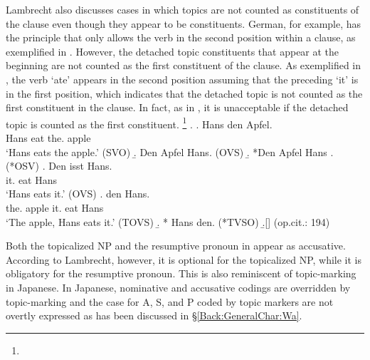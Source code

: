 Lambrecht also discusses cases in which
topics are not counted as constituents of the clause
even though they appear to be constituents.
German, for example, has the principle that only allows the verb in the second position within a clause, as exemplified in \Next[a-d].
However, the detached topic constituents that appear at the beginning are not counted as the first constituent of the clause.
As exemplified in \Next[e],
the verb  `ate' appears in the second position assuming that the preceding  `it' is in the first position,
which indicates that
the detached topic  is not counted as the first constituent in the clause.
In fact, as in \Next[f],
it is unacceptable
if the detached topic  is counted as the first constituent.%
 \footnote{
 }
%
\ex.\label{Par:Subj:Ex:Ex:Apfel}
 \ag. Hans  den Apfel. \\
   Hans eat the. apple \\
   `Hans eats the apple.' \hfill{(SVO)}
 \b. Den Apfel  Hans. \hfill{(OVS)}
 \b. *Den Apfel Hans .\hfill{(*OSV)}
 \bg. Den isst Hans. \\
   it. eat Hans \\
   `Hans eats it.' \hfill{(OVS)}
 \bg.   den  Hans. \\
   the. apple it. eat Hans \\
   `The apple, Hans eats it.'  \hfill{(TOVS)}
 \b. *   Hans den. \hfill{(*TVSO)}
 \b.[] \hfill{(op.cit.: 194)}

Both the topicalized NP  and the resumptive pronoun  in \Last[e] appear as accusative.
According to Lambrecht, however,
it is optional for the topicalized NP,
while it is obligatory for the resumptive pronoun.
This is also reminiscent of topic-marking in Japanese.
In Japanese,
nominative and accusative codings are overridden by topic-marking
and the case for A, S, and P coded by topic markers are not overtly expressed
as has been discussed in \S \ref{Back:GeneralChar:Wa}.


